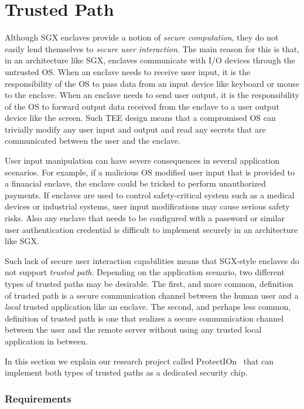 
\section*{Trusted Path}

Although SGX enclaves provide a notion of \emph{secure computation}, they do not easily lend themselves to \emph{secure user interaction}. The main reason for this is that, in an architecture like SGX, enclaves communicate with I/O devices through the untrusted OS. When an enclave needs to receive user input, it is the responsibility of the OS to pass data from an input device like keyboard or mouse to the enclave. When an enclave needs to send user output, it is the responsibility of the OS to forward output data received from the enclave to a user output device like the screen. Such TEE design means that a compromised OS can trivially modify any user input and output and read any secrets that are communicated between the user and the enclave. 

User input manipulation can have severe consequences in several application scenarios. For example, if a malicious OS modified user input that is provided to a financial enclave, the enclave could be tricked to perform unauthorized payments. If enclaves are used to control safety-critical system such as a medical devices or industrial systems, user input modifications may cause serious safety risks. Also any enclave that needs to be configured with a password or similar user authentication credential is difficult to implement securely in an architecture like SGX.

Such lack of secure user interaction capabilities means that SGX-style enclaves do not support \emph{trusted path}. Depending on the application scenario, two different types of trusted paths may be desirable. The first, and more common, definition of trusted path is a secure communication channel between the human user and a \emph{local} trusted application like an enclave. The second, and perhaps less common, definition of trusted path is one that realizes a secure communication channel between the user and the remote server without using any trusted local application in between. 

In this section we explain our research project called ProtectIOn~\cite{protection} that can implement both types of trusted paths as a dedicated security chip. 


\subsubsection*{Requirements}

